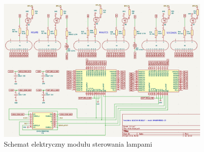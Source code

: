 \documentclass[../../main.tex]{subfiles}
\begin{document}
\begin{figure}[H]
    \centering
    \includegraphics[width=0.95\textwidth]{nixie.png}
    \caption{Schemat elektryczny modułu sterowania lampami}
    \label{fig:nixie}
\end{figure}
\end{document}
